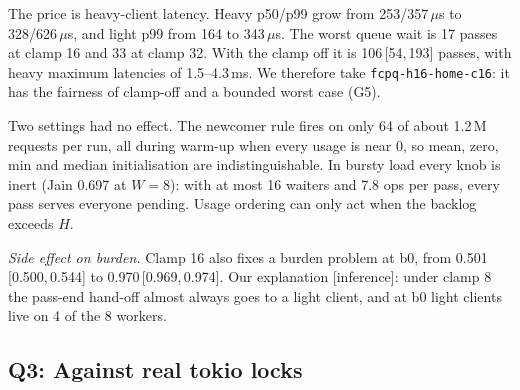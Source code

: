 \documentclass[10pt,twocolumn]{article}
\newcommand{\lk}[1]{\texttt{#1}}
\newcommand{\rng}[2]{{\scriptsize\,[#1,\,#2]}}
\begin{document}
The price is heavy-client latency. Heavy p50/p99 grow from 253/357\,$\mu$s to
328/626\,$\mu$s, and light p99 from 164 to 343\,$\mu$s. The worst queue wait
is 17 passes at clamp 16 and 33 at clamp 32. With the clamp off it is
106\rng{54}{193} passes, with heavy maximum latencies of 1.5--4.3\,ms.
We therefore take \lk{fcpq-h16-home-c16}: it has the fairness of clamp-off and
a bounded worst case (G5).

Two settings had no effect. The newcomer rule fires on only 64 of about
1.2\,M requests per run, all during warm-up when every usage is near 0, so
mean, zero, min and median initialisation are indistinguishable. In bursty
load every knob is inert (Jain 0.697 at $W{=}8$): with at most 16 waiters and
7.8 ops per pass, every pass serves everyone pending. Usage ordering can only
act when the backlog exceeds $H$.

\emph{Side effect on burden.} Clamp 16 also fixes a burden problem at b0, from
0.501\rng{0.500}{0.544} to 0.970\rng{0.969}{0.974}. Our explanation
[inference]: under clamp 8 the pass-end hand-off almost always goes to a light
client, and at b0 light clients live on 4 of the 8 workers.

\subsection{Q3: Against real tokio locks}\label{sec:q3}

\begin{table}[t]
\centering\footnotesize\setlength{\tabcolsep}{3.5pt}
\caption{Throughput against tokio 1.53.1 (09-28 window; coro rows b31).
  $\times$tm is the ratio to \lk{tokio-mutex} in the same cell.
  \lk{fcpq-h16-home} (clamp 8) counts cheap light ops and is not a
  like-for-like throughput reference. \textbf{The bursty ratios of 4--5$\times$
  are largely due to tokio's LIFO slot; see Table~\ref{tab:lifo}.}}
\label{tab:xrt}
\end{table}

\begin{table}[t]
\centering\footnotesize\setlength{\tabcolsep}{3.5pt}
\caption{Service Jain and starved clients/bystanders for the runs of
  Table~\ref{tab:xrt}. \lk{std-mutex} and \lk{parking-lot} are really $W$
  pinned threads on a blocking mutex (see text).}
\label{tab:xrtfair}
\end{table}

\begin{table}[t]
\centering\footnotesize\setlength{\tabcolsep}{2.5pt}
\caption{tokio LIFO slot on/off (Mops/s; throwaway \lk{tokio\_unstable}
  build whose LIFO-on runs are 0.96--1.00$\times$ the release binary; 09-28
  window). The right-hand columns divide the coro throughputs of
  Table~\ref{tab:xrt} by LIFO-off \lk{tokio-mutex}.}
\label{tab:lifo}
\end{table}
\end{document}
